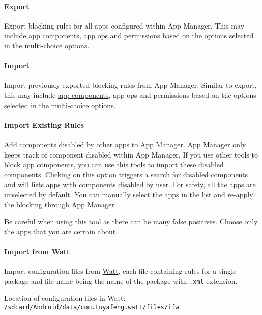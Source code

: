 
\paragraph{Export} Export blocking rules for all apps configured within App Manager. This may include
\hyperref[subsec:faq:what-are-app-components]{app components}, app ops and permissions based on the options selected in
the multi-choice options.

\paragraph{Import} Import previously exported blocking rules from App Manager. Similar to export, this may include
\hyperref[subsec:faq:what-are-app-components]{app components}, app ops and permissions based on the options selected in
the multi-choice options.

\paragraph{Import Existing Rules}
\label{par:import-existing-rules}
Add components disabled by other apps to App Manager. App Manager only keeps track of component disabled within
App Manager. If you use other tools to block app components, you can use this tools to import these disabled components.
Clicking on this option triggers a search for disabled components and will lists apps with components disabled by user.
For safety, all the apps are unselected by default. You can manually select the apps in the list and re-apply the
blocking through App Manager.

\begin{danger}[Caution]
    Be careful when using this tool as there can be many false positives. Choose only the apps that you are certain about.
\end{danger}

\paragraph{Import from Watt} Import configuration files from \href{https://github.com/tuyafeng/Watt}{Watt}, each file
containing rules for a single package and file name being the name of the package with \texttt{.xml} extension.

\begin{tip}
    Location of configuration files in Watt: \texttt{/sdcard/Android/data/com.tuyafeng.watt/files/ifw}
\end{tip}

